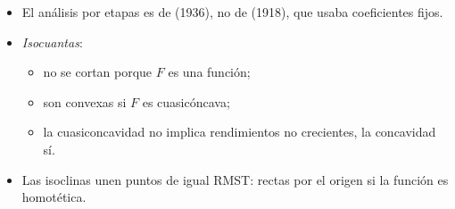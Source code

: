 \documentclass[11pt]{article}
\begin{document}
\begin{itemize}
  \begin{itemize}
  \item etapa I hasta el máximo de $\mathrm{PMe}_L$ (margen extensivo, $\varepsilon_{q,z_L}=1$);
  \item etapa II hasta $\mathrm{PMg}_L=0$ (margen intensivo, máximo del producto total);
  \item la empresa racional produce en la etapa II.
  \end{itemize}
\item El análisis por etapas es de  (1936), no de  (1918), que usaba coeficientes fijos.
\item \emph{Isocuantas}:
  \begin{itemize}
  \item no se cortan porque $F$ es una función;
  \item son convexas si $F$ es cuasicóncava;
  \item la cuasiconcavidad no implica rendimientos no crecientes, la concavidad sí.
  \end{itemize}
\item Las isoclinas unen puntos de igual RMST: rectas por el origen si la función es homotética.
\end{itemize}

\bibliografia
\end{document}
